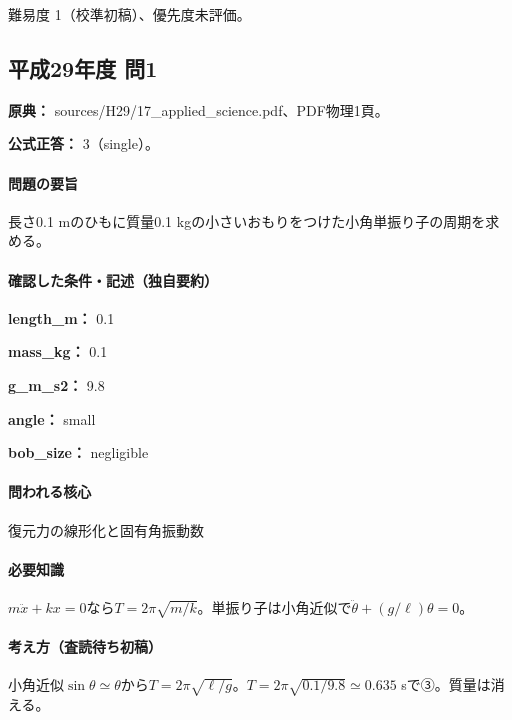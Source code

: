 \par 難易度 1（校準初稿）、優先度未評価。

\subsection{平成29年度 問1}
\label{q:h29-reg-applied-01}

\noindent\textbf{原典：} sources/H29/17\_applied\_science.pdf、PDF物理1頁。

\textbf{公式正答：} 3（single）。

\paragraph{問題の要旨} 長さ0.1 mのひもに質量0.1 kgの小さいおもりをつけた小角単振り子の周期を求める。

\paragraph{確認した条件・記述（独自要約）}\mbox{}\par

\noindent\textbf{length\_m：} 0.1\par

\noindent\textbf{mass\_kg：} 0.1\par

\noindent\textbf{g\_m\_s2：} 9.8\par

\noindent\textbf{angle：} small\par

\noindent\textbf{bob\_size：} negligible\par

\paragraph{問われる核心} 復元力の線形化と固有角振動数

\paragraph{必要知識} \(m\ddot x+kx=0\)なら\(T=2\pi\sqrt{m/k}\)。単振り子は小角近似で\(\ddot\theta+(g/\ell)\theta=0\)。

\paragraph{考え方（査読待ち初稿）} 小角近似\(\sin\theta\simeq\theta\)から\(T=2\pi\sqrt{\ell/g}\)。\(T=2\pi\sqrt{0.1/9.8}\simeq0.635\) sで③。質量は消える。

